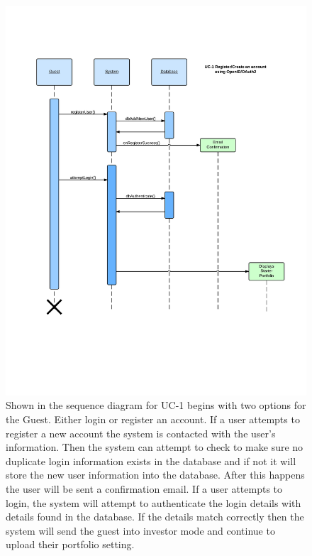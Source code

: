 \begin{figure}[H]
\centering
\includegraphics[width=5.5in]{./img/inter/uc1.jpg}
\caption{Shown in the sequence diagram
for UC-1 begins with two options for the Guest. Either login or
register an account. If a user attempts to register a new account
the system is contacted with the user’s information. Then the
system can attempt to check to make sure no duplicate login
information exists in the database and if not it will store the new
user information into the database. After this happens the user will
be sent a confirmation email. If a user attempts to login, the system will
attempt to authenticate
the login details with details found in the database. If the details
match correctly then the system will send the guest into investor
mode and continue to upload their portfolio setting.}
\end{figure}



